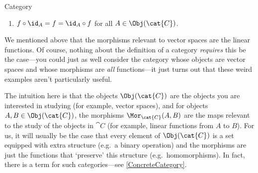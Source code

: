 \begin{dfn}{Category}{}
\begin{enumerate}
\item $f\circ \id _A=f=\id _A\circ f$ for all $A\in \Obj (\cat{C})$.
\end{enumerate}
\begin{rmk}
We mentioned above that the morphisms relevant to vector spaces are the linear functions.  Of course, nothing about the definition of a category \emph{requires} this be the case---you could just as well consider the category whose objects are vector spaces and whose morphisms are \emph{all} functions---it just turns out that these weird examples aren't particularly useful.
\end{rmk}
\end{dfn}
The intuition here is that the objects $\Obj (\cat{C})$ are the objects you are interested in studying (for example, vector spaces), and for objects $A,B\in \Obj (\cat{C})$, the morphisms $\Mor _{\cat{C}}(A,B)$ are the maps relevant to the study of the objects in $\cat{C}$ (for example, linear functions from $A$ to $B$).  For us, it will usually be the case that every element of $\Obj (\cat{C})$ is a set equipped with extra structure (e.g.~a binary operation) and the morphisms are just the functions that `preserve' this structure (e.g.~homomorphisms).  In fact, there is a term for such categories---see \cref{ConcreteCategory}.

